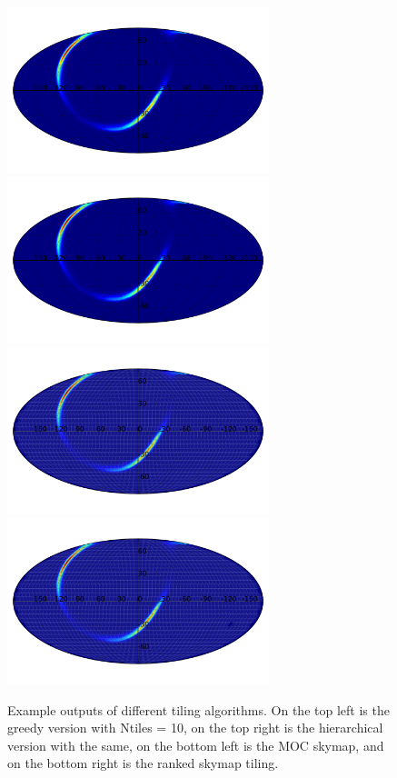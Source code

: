 \documentclass[twocolumn]{aastex61}
\begin{document}
\begin{figure}
    \centering
    \includegraphics[width=3in]{tiling_greedy}
    \includegraphics[width=3in]{tiling_hierarchical}
    \includegraphics[width=3in]{tiling_moc}
    \includegraphics[width=3in]{tiling_ranked}
    \caption{Example outputs of different tiling algorithms. On the top left is the greedy version with Ntiles = 10, on the top right is the hierarchical version with the same, on the bottom left is the MOC skymap, and on the bottom right is the ranked skymap tiling.}
    \label{fig:tiling}
\end{figure}
\end{document}
